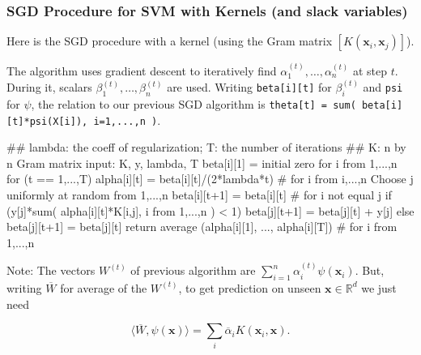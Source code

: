 \documentclass[smaller]{beamer}
\theoremstyle{example}
\newcommand{\x}{\textbf{x}}
\begin{document}
\begin{frame}[fragile]
    \frametitle{SGD Procedure for SVM with Kernels (and slack variables)}
    Here is the SGD procedure with a kernel (using the Gram matrix $[K(\x_i, \x_j)]$).

    \pause
    The algorithm uses gradient descent to iteratively find $\alpha_1^{(t)},\ldots,\alpha_n^{(t)}$ at step $t$. During it, scalars $\beta_1^{(t)},\ldots,\beta_n^{(t)}$ are used. Writing \lstinline[language=Pseudo,basicstyle=\ttfamily]{beta[i][t]} for $\beta_i^{(t)}$ and \lstinline[language=Pseudo,basicstyle=\ttfamily]{psi} for $\psi$, the relation to our previous SGD algorithm is \lstinline[language=Pseudo,basicstyle=\ttfamily]{theta[t] = sum( beta[i][t]*psi(X[i]), i=1,...,n )}.
\pause

\begin{pseudo}
## lambda: the coeff of regularization; T: the number of iterations
## K: n by n Gram matrix
input: K, y, lambda, T
beta[i][1] = initial zero for i from 1,...,n
for (t == 1,...,T){
    alpha[i][t] = beta[i][t]/(2*lambda*t)  # for i from i,...,n
    Choose j uniformly at random from 1,...,n
    beta[i][t+1] = beta[i][t] # for i not equal j
    if (y[j]*sum( alpha[i][t]*K[i,j], i from 1,...,n ) < 1)
        beta[j][t+1] = beta[j][t] + y[j]
    else 
        beta[j][t+1] = beta[j][t]
}
return average (alpha[i][1], ..., alpha[i][T]) # for i from 1,...,n
\end{pseudo}

\pause
Note: The vectors $W^{(t)}$ of previous algorithm are $\sum_{i=1}^n\alpha_i^{(t)}\psi(\x_i)$. But, writing $\overline{W}$ for average of the $W^{(t)}$, to get prediction on unseen $\x\in\mathbb R^d$ we just need 
    
    \vspace{-7pt}
    {\small
    \[\langle\overline{W}, \psi(\x)\rangle = \sum_{i}\overline{\alpha}_i K(\x_i, \x).\]
    }
\end{frame}
\end{document}
